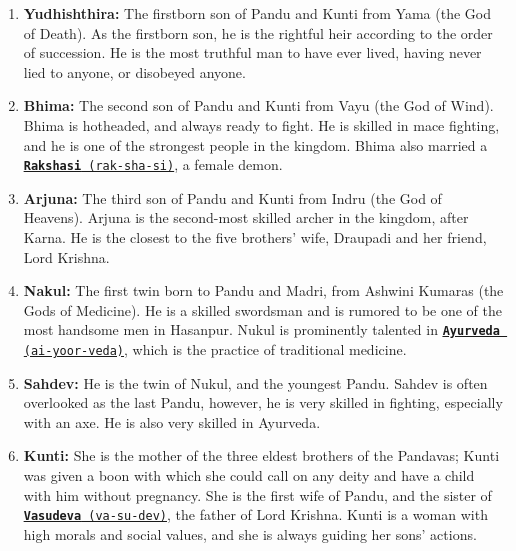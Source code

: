 \documentclass[10pt, letterpaper]{article}
\begin{document}
\begin{enumerate}
\item
  
  \textbf{Yudhishthira:} The firstborn son of Pandu and Kunti from Yama
  (the God of Death). As the firstborn son, he is the rightful heir
  according to the order of succession. He is the most truthful man to
  have ever lived, having never lied to anyone, or disobeyed anyone.
  
\item
  
  \textbf{Bhima:} The second son of Pandu and Kunti from Vayu (the God
  of Wind). Bhima is hotheaded, and always ready to fight. He is skilled
  in mace fighting, and he is one of the strongest people in the
  kingdom. Bhima also married a
  \texttt{\underline{\href{https://drive.google.com/file/d/1MvynrAayXduZipLCU3J3MlLGPRW-anp0/view?usp=sharing}{\textbf{Rakshasi}}
  (rak-sha-si)}}, a female demon.
  
\item
  
  \textbf{Arjuna:} The third son of Pandu and Kunti from Indru (the God
  of Heavens). Arjuna is the second-most skilled archer in the kingdom,
  after Karna. He is the closest to the five brothers' wife, Draupadi
  and her friend, Lord Krishna.
  
\item
  
  \textbf{Nakul:} The first twin born to Pandu and Madri, from Ashwini
  Kumaras (the Gods of Medicine). He is a skilled swordsman and is
  rumored to be one of the most handsome men in Hasanpur. Nukul is
  prominently talented in
  \texttt{\underline{\href{https://drive.google.com/file/d/1DBhFt8kpg8uhb4hOCWXNuWpg1fKumpgj/view?usp=sharing}{\textbf{Ayurveda}}
  (ai-yoor-veda)}}, which is the practice of traditional medicine.
  
\item
  
  \textbf{Sahdev:} He is the twin of Nukul, and the youngest Pandu.
  Sahdev is often overlooked as the last Pandu, however, he is very
  skilled in fighting, especially with an axe. He is also very skilled
  in Ayurveda.
  
\item
  
  \textbf{Kunti:} She is the mother of the three eldest brothers of the
  Pandavas; Kunti was given a boon with which she could call on any
  deity and have a child with him without pregnancy. She is the first
  wife of Pandu, and the sister of
  \texttt{\underline{\href{https://drive.google.com/file/d/139X4vOrEpzwGqjfrPLO7SG2t1NJjEgDf/view?usp=sharing}{\textbf{Vasudeva}}
  (va-su-dev)}}, the father of Lord Krishna. Kunti is a woman with high
  morals and social values, and she is always guiding her sons' actions.
  

\end{enumerate}
\end{document}
